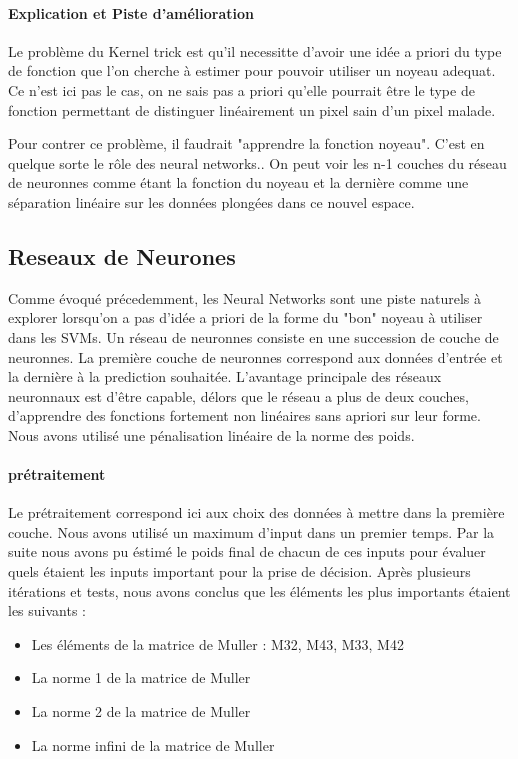 \documentclass[a4paper,10pt]{report}
\begin{document}
\paragraph{Explication et Piste d'amélioration}
Le problème du Kernel trick est qu'il necessitte d'avoir une idée a priori du type de fonction que l'on cherche à estimer pour pouvoir utiliser un noyeau adequat. Ce n'est ici pas le cas, on ne sais pas a priori qu'elle pourrait être le type de fonction permettant de distinguer linéairement un pixel sain d'un pixel malade.

Pour contrer ce problème, il faudrait "apprendre la fonction noyeau". C'est en quelque sorte le rôle des neural networks.. On peut voir les n-1 couches du réseau de neuronnes comme étant la fonction du noyeau et la dernière comme une séparation linéaire sur les données plongées dans ce nouvel espace.

\subsection{Reseaux de Neurones}

Comme évoqué précedemment, les Neural Networks sont une piste naturels à explorer lorsqu'on a pas d'idée a priori de la forme du "bon" noyeau à utiliser dans les SVMs. Un réseau de neuronnes consiste en une succession de couche de neuronnes. La première couche de neuronnes correspond aux données d'entrée et la dernière à la prediction souhaitée. L'avantage principale des réseaux neuronnaux est d'être capable, délors que le réseau a plus de deux couches, d'apprendre des fonctions fortement non linéaires sans apriori sur leur forme. Nous avons utilisé une pénalisation linéaire de la norme des poids. 

\paragraph{prétraitement}
Le prétraitement correspond ici aux choix des données à mettre dans la première couche. Nous avons utilisé un maximum d'input dans un premier temps. Par la suite nous avons pu éstimé le poids final de chacun de  ces inputs pour évaluer quels étaient les inputs important pour la prise de décision. Après plusieurs itérations et tests, nous avons conclus que les éléments les plus importants étaient les suivants :

\begin{itemize}

    \item Les éléments de la matrice de Muller : M32, 	M43, M33, M42

    \item La norme 1 de la matrice de Muller 
    
    \item La norme 2 de la matrice de Muller 

    \item La norme infini de la matrice de Muller  

\end{itemize}
\end{document}
